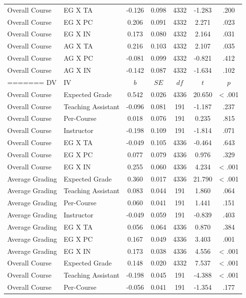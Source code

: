 \documentclass[,man]{apa6}
\theoremstyle{definition}
\theoremstyle{definition}
\theoremstyle{definition}
\theoremstyle{remark}
\begin{document}
\begin{table}[tbp]
\begin{center}
\begin{threeparttable}
{\begin{tabular}{llccccc}
Overall Course & EG X TA & -0.126 & 0.098 & 4332 & -1.283 & .200\\
Overall Course & EG X PC & 0.206 & 0.091 & 4332 & 2.271 & .023\\
Overall Course & EG X IN & 0.173 & 0.080 & 4332 & 2.164 & .031\\
Overall Course & AG X TA & 0.216 & 0.103 & 4332 & 2.107 & .035\\
Overall Course & AG X PC & -0.081 & 0.099 & 4332 & -0.821 & .412\\
Overall Course & AG X IN & -0.142 & 0.087 & 4332 & -1.634 & .102\\
=======
DV & IV & $b$ & $SE$ & $df$ & $t$ & $p$\\
\midrule
Overall Course & Expected Grade & 0.542 & 0.026 & 4336 & 20.650 & < .001\\
Overall Course & Teaching Assistant & -0.096 & 0.081 & 191 & -1.187 & .237\\
Overall Course & Per-Course & 0.018 & 0.076 & 191 & 0.235 & .815\\
Overall Course & Instructor & -0.198 & 0.109 & 191 & -1.814 & .071\\
Overall Course & EG X TA & -0.049 & 0.105 & 4336 & -0.464 & .643\\
Overall Course & EG X PC & 0.077 & 0.079 & 4336 & 0.976 & .329\\
Overall Course & EG X IN & 0.255 & 0.060 & 4336 & 4.234 & < .001\\
Average Grading & Expected Grade & 0.360 & 0.017 & 4336 & 21.790 & < .001\\
Average Grading & Teaching Assistant & 0.083 & 0.044 & 191 & 1.860 & .064\\
Average Grading & Per-Course & 0.060 & 0.041 & 191 & 1.441 & .151\\
Average Grading & Instructor & -0.049 & 0.059 & 191 & -0.839 & .403\\
Average Grading & EG X TA & 0.056 & 0.064 & 4336 & 0.870 & .384\\
Average Grading & EG X PC & 0.167 & 0.049 & 4336 & 3.403 & .001\\
Average Grading & EG X IN & 0.173 & 0.038 & 4336 & 4.556 & < .001\\
Overall Course & Expected Grade & 0.148 & 0.020 & 4332 & 7.537 & < .001\\
Overall Course & Teaching Assistant & -0.198 & 0.045 & 191 & -4.388 & < .001\\
Overall Course & Per-Course & -0.056 & 0.041 & 191 & -1.354 & .177\\

\end{tabular}}
\end{threeparttable}
\end{center}
\end{table}
\end{document}
